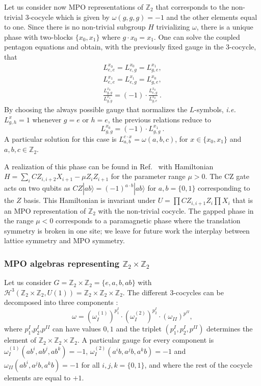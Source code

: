 \documentclass[a4paper,twocolumn,11pt,accepted=2023-02-10]{quantumarticle}
\begin{document}
Let us consider now MPO representations of $\mathbb{Z}_2$ that corresponds to the non-trivial $3$-cocycle which is given by $\omega(g,g,g) = -1$ and the other elements equal to one. Since there is no non-trivial subgroup $H$ trivializing $\omega$, there is a unique phase with two-blocks $\{x_0,x_1\}$ where $g{\cdot} x_0= x_1$. One can solve the coupled pentagon equations and obtain, with the previously fixed gauge in the $3$-cocycle, that
\begin{align*}
 {L}_{e,e}^{x_0} = {L}_{e,g}^{x_0} = {L}_{g,e}^{x_1}, \\  
  {L}_{e,e}^{x_1} = {L}_{e,g}^{x_1} = {L}_{g,e}^{x_0},  \\ 
  \frac{{L}_{g,g}^{x_0}}{{L}_{g,g}^{x_1}} = (-1)\cdot \frac{{L}_{e,g}^{x_0}}{{L}_{g,e}^{x_0}} \ .
\end{align*}
By choosing the always possible gauge that normalizes the ${L}$-symbols, {\it i.e.} ${L}_{g,h}^x=1$ whenever $g=e$ or $h=e$, the previous relations reduce to  
$${L}_{g,g}^{x_0}= (-1) \cdot {L}_{g,g}^{x_1}\ .$$
A particular solution for this case is ${L}_{a,b}^{c{\cdot} x} = \omega(a,b,c)$, for $x\in \{x_0,x_1\}$ and $a,b,c\in \mathbb{Z}_2$. 

A realization of this phase can be found in Ref.\ \cite{Roose19} with Hamiltonian $H=\sum_i CZ_{i,i+2}X_{i+1}-\mu Z_i Z_{i+1}$ for the parameter range $\mu>0$. The CZ gate acts on two qubits as $CZ|ab\rangle = (-1)^{a\cdot b}|ab\rangle$ for $a,b=\{0,1\}$ corresponding to the $Z$ basis. This Hamiltonian is invariant under $U=\prod CZ_{i,i+1}Z_i \prod X_i$ that is an MPO representation of $\mathbb{Z}_2$ with the non-trivial cocycle. The gapped phase in the range $\mu<0$ corresponds to a paramagnetic phase where the translation symmetry is broken in one site; we leave for future work the interplay between lattice symmetry and MPO symmetry.

\subsubsection{MPO algebras representing  $\mathbb{Z}_2 \times \mathbb{Z}_2$}

Let us consider $G = \mathbb{Z}_2 {\times} \mathbb{Z}_2 =\{e,a,b,ab\}$ with $\mathcal{H}^3(\mathbb{Z}_2 {\times} \mathbb{Z}_2,U(1))= \mathbb{Z}_2 {\times} \mathbb{Z}_2 {\times} \mathbb{Z}_2$. The different $3$-cocycles can be decomposed into three components \cite{ThesisMark}: $$\omega = (\omega_I^{(1)})^{p_1^I} \cdot (\omega_I^{(2)})^{p_2^I} \cdot (\omega_{II})^{p^{II}},$$
where $p_1^I$,$p_2^I$,$p^{II}$ can have values $0,1$ and the triplet $(p_1^I,p_2^I,p^{II})$ determines the element of $\mathbb{Z}_2 {\times} \mathbb{Z}_2 {\times} \mathbb{Z}_2$. A particular gauge for every component is $\omega_I^{(1)}(a b^i,a b^j, a b^k) = -1 $, $\omega_I^{(2)}(a^i b,a^j b, a^k b) = -1 $ and $\omega_{II}(ab^i,a^jb,a^k b) = -1$ for all $i,j,k=\{0,1\}$, and where the rest of the cocycle elements are equal to $+1$.
\end{document}
